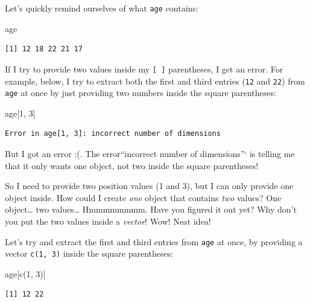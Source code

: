 \documentclass[
  letterpaper,
  DIV=11,
  numbers=noendperiod]{scrreprt}
\newenvironment{Shaded}{\begin{snugshade}}{\end{snugshade}}
\newcommand{\DecValTok}[1]{\textcolor[rgb]{0.68,0.00,0.00}{#1}}
\newcommand{\FunctionTok}[1]{\textcolor[rgb]{0.28,0.35,0.67}{#1}}
\newcommand{\NormalTok}[1]{\textcolor[rgb]{0.00,0.23,0.31}{#1}}
\begin{document}
Let's quickly remind ourselves of what \texttt{age} contains:

\begin{Shaded}
\begin{Highlighting}[]
\NormalTok{age}
\end{Highlighting}
\end{Shaded}

\begin{verbatim}
[1] 12 18 22 21 17
\end{verbatim}

If I try to provide two values inside my \texttt{{[}\ {]}} parentheses,
I get an error. For example, below, I try to extract both the first and
third entries (\texttt{12} and \texttt{22}) from \texttt{age} at once by
just providing two numbers inside the square parentheses:

\begin{Shaded}
\begin{Highlighting}[]
\NormalTok{age[}\DecValTok{1}\NormalTok{, }\DecValTok{3}\NormalTok{]}
\end{Highlighting}
\end{Shaded}

\begin{verbatim}
Error in age[1, 3]: incorrect number of dimensions
\end{verbatim}

But I got an error :(. The error\texttt{}``incorrect number of
dimensions''` is telling me that it only wants one object, not two
inside the square parentheses!

So I need to provide two position values (1 and 3), but I can only
provide one object inside. How could I create \emph{one} object that
contains \emph{two} values? One object\ldots{} two values\ldots{}
Hmmmmmmmm. Have you figured it out yet? Why don't you put the two values
inside a \emph{vector}! Wow! Neat idea!

Let's try and extract the first and third entries from \texttt{age} at
once, by providing a vector \texttt{c(1,\ 3)} inside the square
parentheses:

\begin{Shaded}
\begin{Highlighting}[]
\NormalTok{age[}\FunctionTok{c}\NormalTok{(}\DecValTok{1}\NormalTok{, }\DecValTok{3}\NormalTok{)]}
\end{Highlighting}
\end{Shaded}

\begin{verbatim}
[1] 12 22
\end{verbatim}
\end{document}
